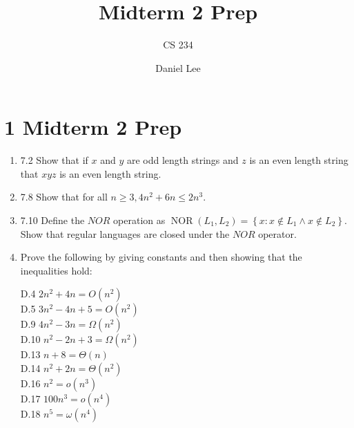 \documentclass[10pt]{article}
\title{Midterm 2 Prep}
\author{CS 234}
\date{Daniel Lee}
\begin{document}
\maketitle

\section*{1 \quad Midterm 2 Prep}

\begin{enumerate}[label={}]
    \item 7.2 Show that if $x$ and $y$ are odd length strings and $z$ is an even length string that $x y z$ is an even length string.\\

    \item 7.8 Show that for all $n \geq 3,4 n^2+6 n \leq 2 n^3$.\\

    \item 7.10 Define the $N O R$ operation as $\operatorname{NOR}\left(L_1, L_2\right)=\left\{x: x \notin L_1 \wedge x \notin L_2\right\}$. Show that regular languages are closed under the $N O R$ operator.\\

    \item Prove the following by giving constants and then showing that the inequalities hold:

          D.4 $2 n^2+4 n=O\left(n^2\right)$\\

          D.5 $3 n^2-4 n+5=O\left(n^2\right)$\\

          D.9 $4 n^2-3 n=\Omega\left(n^2\right)$\\

          D.10 $n^2-2 n+3=\Omega\left(n^2\right)$\\

          D.13 $n+8=\Theta(n)$\\

          D.14 $n^2+2 n=\Theta\left(n^2\right)$\\

          D.16 $n^2=o\left(n^3\right)$\\

          D.17 $100 n^3=o\left(n^4\right)$\\

          D.18 $n^5=\omega\left(n^4\right)$\\


\end{enumerate}
\end{document}
